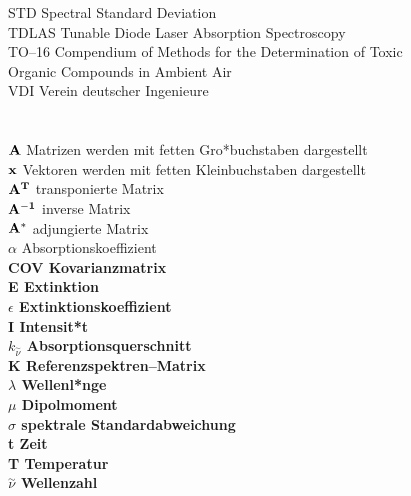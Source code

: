 \begin{tabbing}
STD \> Spectral Standard Deviation\\
TDLAS \> Tunable Diode Laser Absorption Spectroscopy\\
TO--16 \> Compendium of Methods for the Determination of Toxic\\
\> Organic Compounds in Ambient Air\\
VDI \> Verein deutscher Ingenieure\\
\> \\
\> \\
$\bf A$ \> Matrizen werden mit fetten Gro*buchstaben dargestellt\\
$\bf x$ \> Vektoren werden mit fetten Kleinbuchstaben dargestellt\\
$\bf A^T$ \> transponierte Matrix\\
$\bf A^{-1}$ \> inverse Matrix\\
$\bf A^*$ \> adjungierte Matrix\\
$\alpha$ \> Absorptionskoeffizient\\
\bf COV \rm \> Kovarianzmatrix\\
E \> Extinktion\\
$\epsilon$ \> Extinktionskoeffizient\\
I \> Intensit*t\\
$k_{\stackrel{\sim}{\nu}}$ \> Absorptionsquerschnitt\\
\bf K \rm \> Referenzspektren--Matrix\\
$\lambda$ \> Wellenl*nge\\
$\mu$ \> Dipolmoment\\
$\sigma$ \> spektrale Standardabweichung\\
t \> Zeit\\
T \> Temperatur\\
$\stackrel{\sim}{\nu}$ \> Wellenzahl\\

\end{tabbing}

\cleardoublepage
